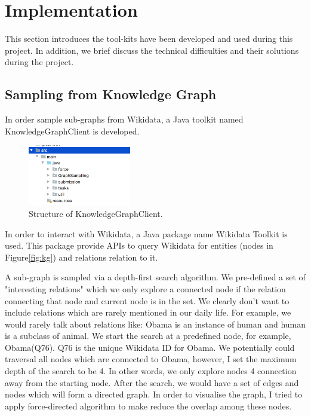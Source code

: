 \documentclass[bsc,frontabs,twoside,singlespacing,parskip,deptreport]{infthesis}     %
\begin{document}
\newpage
\section{Implementation}

This section introduces the tool-kits have been developed and used during this project. In addition, we brief discuss the technical difficulties and their solutions during the project.

\subsection{Sampling from Knowledge Graph}

In order sample sub-graphs from Wikidata, a Java toolkit named KnowledgeGraphClient is developed.

\begin{figure}[h]
    \centering
    \includegraphics[width=0.4\textwidth]{client.png}
    \caption{Structure of KnowledgeGraphClient.}
    \label{fig:client}
\end{figure}

In order to interact with Wikidata, a Java package name Wikidata Toolkit\cite{wikitoolkit} is used. This package provide APIs to query Wikidata for entities (nodes in Figure\ref{fig:kg}) and relations relation to it.



A sub-graph is sampled via a depth-first search algorithm. We pre-defined a set of "interesting relations" which we only explore a connected node if the relation connecting that node and current node is in the set. We clearly don't want to include relations which are rarely mentioned in our daily life. For example, we would rarely talk about relations like: Obama is an instance of human and human is a subclass of animal. We start the search at a predefined node, for example, Obama(Q76). Q76 is the unique Wikidata ID for Obama. We potentially could traversal all nodes which are connected to Obama, however, I set the maximum depth of the search to be 4. In other words, we only explore nodes 4 connection away from the starting node. After the search, we would have a set of edges and nodes which will form a directed graph. In order to visualise the graph, I tried to apply force-directed algorithm to make reduce the overlap among these nodes.
\end{document}
